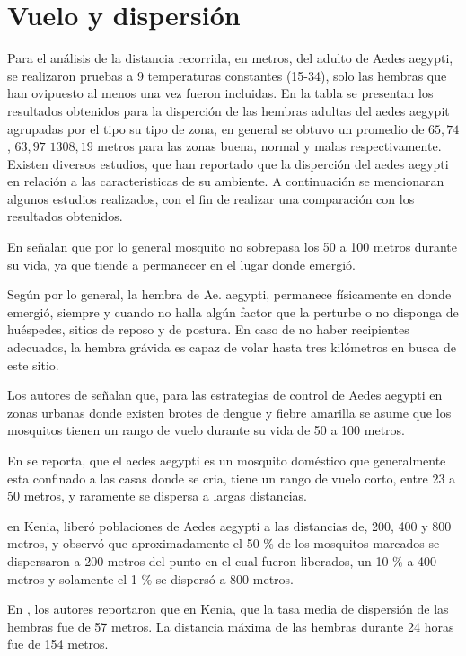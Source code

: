 \section{Vuelo y dispersión}
Para el análisis de la distancia recorrida, en metros, del adulto de Aedes aegypti, se realizaron
pruebas a 9 temperaturas constantes (15-34\textcelsius), solo las hembras que han ovipuesto al
menos una vez fueron incluidas. En la tabla  se presentan los
resultados obtenidos para la disperción de las hembras adultas del aedes aegypit agrupadas por el
tipo su tipo de zona, en general se obtuvo un promedio de $65,74$, $63,97$ $1308,19$ metros para las zonas buena, normal y malas respectivamente. Existen diversos estudios, que han reportado que
la disperción del aedes aegypti en relación a las caracteristicas de su ambiente. A continuación
se mencionaran algunos estudios realizados, con el fin de realizar una comparación con los resultados obtenidos.

En \cite{cabezas2005dengue} señalan que por lo general mosquito no sobrepasa los 50 a 100 metros
durante su vida, ya que tiende a permanecer en el lugar donde emergió.

Según \cite{ThironIzcazaJ2003} por lo general, la hembra de Ae. aegypti, permanece físicamente en
donde emergió, siempre y cuando no halla algún factor que la perturbe o no disponga de huéspedes,
sitios de reposo y de postura. En caso de no haber recipientes adecuados, la hembra grávida es capaz de volar hasta tres kilómetros en busca de este sitio.

Los autores de \cite{dengueUruguayCap8} señalan que, para las estrategias de control de Aedes
aegypti en zonas urbanas donde existen brotes de dengue y fiebre amarilla se asume que los
mosquitos tienen un rango de vuelo durante su vida de 50 a 100 metros.

En \cite{luevano1993ciclo} se reporta, que el aedes aegypti es un mosquito doméstico que
generalmente esta confinado a las casas donde se cria, tiene un rango de vuelo corto, entre 23 a 50 metros, y raramente se dispersa a largas distancias.

\cite{mcdonald1977population} en Kenia, liberó poblaciones de Aedes aegypti a las distancias de,
200, 400 y 800 metros, y observó que aproximadamente el 50 \% de los mosquitos marcados se
dispersaron a 200 metros del punto en el cual fueron liberados, un 10 \% a 400 metros y solamente
el 1 \% se dispersó a 800 metros.

En \cite{trpis1986dispersal}, los autores reportaron que en Kenia, que la tasa media de dispersión
de las hembras fue de 57 metros. La distancia máxima de las hembras durante 24 horas fue de 154
metros.

